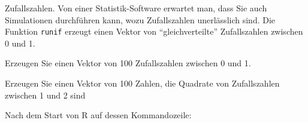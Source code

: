 Zufallszahlen. Von einer Statistik-Software erwartet man, dass Sie auch
Simulationen durchführen kann, wozu Zufallszahlen unerlässlich sind.
Die Funktion {\tt runif} erzeugt einen Vektor von ``gleichverteilte''
Zufallszahlen zwischen 0 und 1.
\begin{teilaufgaben}
\item Erzeugen Sie einen Vektor von 100 Zufallszahlen zwischen 0 und 1.
\item Erzeugen Sie einen Vektor von 100 Zahlen, die Quadrate
von Zufallszahlen zwischen 1 und 2 sind
\end{teilaufgaben}


\begin{loesung}
Nach dem Start von R auf dessen Kommandozeile:
\end{loesung}

